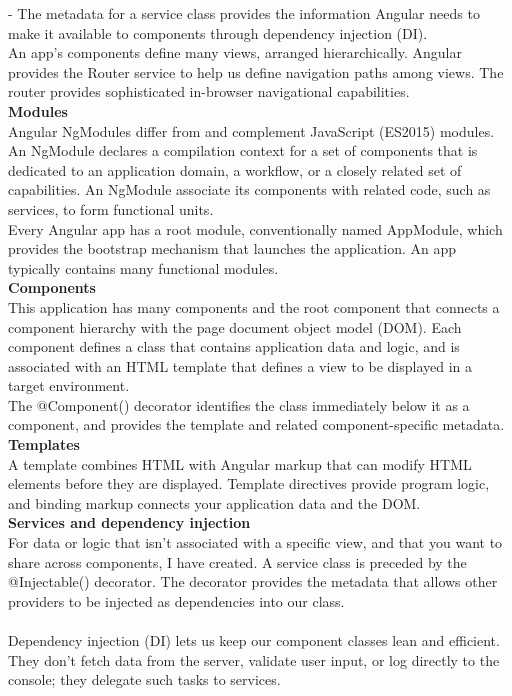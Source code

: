 \documentclass{scrartcl}
\begin{document}
 - The metadata for a service class provides the information Angular needs to make it available to components through dependency injection (DI).\\

An app's components define many views, arranged hierarchically. Angular provides the Router service to help us define navigation paths among views. The router provides sophisticated in-browser navigational capabilities.\\

\textbf{Modules} \\
Angular NgModules differ from and complement JavaScript (ES2015) modules. An NgModule declares a compilation context for a set of components that is dedicated to an application domain, a workflow, or a closely related set of capabilities. An NgModule associate its components with related code, such as services, to form functional units.\\

Every Angular app has a root module, conventionally named AppModule, which provides the bootstrap mechanism that launches the application. An app typically contains many functional modules.\\


\textbf{Components}\\
This application has many components and the root component that connects a component hierarchy with the page document object model (DOM). Each component defines a class that contains application data and logic, and is associated with an HTML template that defines a view to be displayed in a target environment.\\

The @Component() decorator identifies the class immediately below it as a component, and provides the template and related component-specific metadata.\\

\textbf{Templates}\\
A template combines HTML with Angular markup that can modify HTML elements before they are displayed. Template directives provide program logic, and binding markup connects your application data and the DOM. \\

\textbf{Services and dependency injection}\\
For data or logic that isn't associated with a specific view, and that you want to share across components, I have created. A service class is preceded by the @Injectable() decorator. The decorator provides the metadata that allows other providers to be injected as dependencies into our class.\\
\\
Dependency injection (DI) lets us keep our component classes lean and efficient. They don't fetch data from the server, validate user input, or log directly to the console; they delegate such tasks to services.\\
\end{document}
